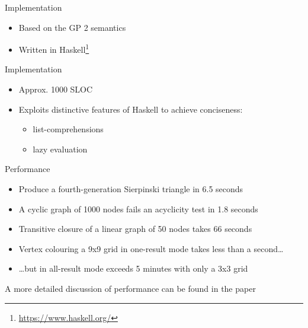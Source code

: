\begin{frame}{Implementation}

\begin{itemize}
\itemsep1pt\parskip0pt
\item
  Based on the GP 2 semantics
\item
  Written in Haskell\footnote{\url{https://www.haskell.org/}}
\end{itemize}

\begin{center}
\scalebox{0.9}{  }
\end{center}

\end{frame}

\begin{frame}{Implementation}

\begin{center}
\small
\scalebox{0.65}{}
\end{center}

\begin{itemize}
\itemsep1pt\parskip0pt
\item
  Approx. 1000 SLOC
\item
  Exploits distinctive features of Haskell to achieve conciseness:

  \begin{itemize}
  \itemsep1pt\parskip0pt
  \item
    list-comprehensions
  \item
    lazy evaluation
  \end{itemize}
\end{itemize}

\end{frame}

\begin{frame}{Performance}

\begin{itemize}
\itemsep1pt\parskip0pt
\item
  Produce a fourth-generation Sierpinski triangle in 6.5 seconds 
\item
  A cyclic graph of 1000 nodes fails an acyclicity test in 1.8 seconds 
\item
  Transitive closure of a linear graph of 50 nodes takes 66 seconds
\item
  Vertex colouring a 9x9 grid in one-result mode takes less than a
  second\ldots{}
\item
  \ldots{}but in all-result mode exceeds 5 minutes with only a 3x3 grid 
\end{itemize}

A more detailed discussion of performance can be found in the paper

\end{frame}

